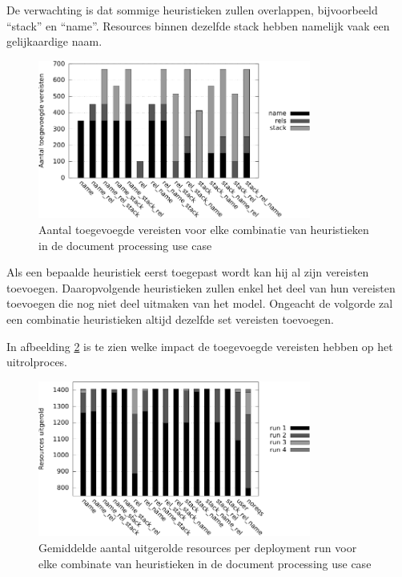 De verwachting is dat sommige heuristieken zullen overlappen, bijvoorbeeld ``stack'' en ``name''. 
Resources binnen dezelfde stack hebben namelijk vaak een gelijkaardige naam. 

\begin{figure}[h]
    \begin{center}
    \includegraphics[width=0.8\textwidth]{images/reqs_doc.pdf}
    \caption{Aantal toegevoegde vereisten voor elke combinatie van heuristieken in de document processing use case}
    \label{fig:reqs_doc}
    \end{center}
\end{figure}

Als een bepaalde heuristiek eerst toegepast wordt kan hij al zijn vereisten toevoegen.
Daaropvolgende heuristieken zullen enkel het deel van hun vereisten toevoegen die nog niet deel uitmaken van het model.
Ongeacht de volgorde zal een combinatie heuristieken altijd dezelfde set vereisten toevoegen.

In afbeelding \ref{fig:time_runs_doc} is te zien welke impact de toegevoegde vereisten hebben op het uitrolproces.

\begin{figure}[h]
    \begin{center}
    \includegraphics[width=0.8\textwidth]{images/time_runs_doc.pdf}
    \caption{Gemiddelde aantal uitgerolde resources per deployment run voor elke combinate van heuristieken in de document processing use case}
    \label{fig:time_runs_doc}
    \end{center}
\end{figure}

